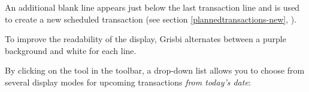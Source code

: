 An additional blank line appears just below the last transaction line and is used to create a new scheduled transaction (see section \vref{plannedtransactions-new}, ).

To improve the readability of the display, Grisbi alternates between a \colorbox[RGB]{215,215,255}{purple background} and white for each line.

By clicking on the \label{plannedtransactions-view} tool in the toolbar, a drop-down list allows you to choose from several display modes for upcoming transactions \textit{from today’s date}:

